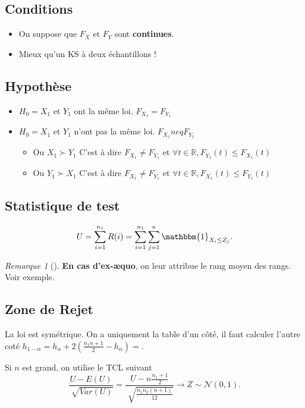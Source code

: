 \documentclass{article}
\theoremstyle{plain}%
\theoremstyle{definition}
\theoremstyle{remark}
\newtheorem*{rem}{Remarque}
\begin{document}
\subsection*{Conditions}
\begin{itemize}
    \item On suppose que $ F_X $ et $ F_Y $ sont \textbf{continues}.
    \item Mieux qu'un KS à deux échantillons !
\end{itemize}


\subsection*{Hypothèse}
\begin{itemize}
    \item $ H_0 = X_1 $ et $ Y_1 $ ont la même loi. $ F_{X_1} = F_{Y_1} $ 
    \item $ H_0 = X_1 $ et $ Y_1 $ n'ont pas la même loi. $ F_{X_1} neq F_{Y_1} $ \begin{itemize}
        \item Ou $ X_1 \succ Y_1 $ C'est à dire $ F_{X_1} \neq F_{Y_1} $ et $ \forall t \in \mathbb{R}, F_{Y_1}(t) \leq F_{X_1}(t) $ 
        \item Ou $ Y_1 \succ X_1 $ C'est à dire $ F_{X_1} \neq F_{Y_1} $ et $ \forall t \in \mathbb{R}, F_{X_1}(t) \leq F_{Y_1}(t) $ 
    \end{itemize}
\end{itemize}

\subsection*{Statistique de test}
\[
    U = \sum_{i=1}^{n_1}R(i) = \sum_{i=1}^{n_1} \sum_{j=1}^{n}\mathbbm{1}_{X_i \leq Z_j}
.\]
\begin{rem}[]
    \textbf{En cas d'ex-æquo}, on leur attribue le rang moyen des rangs. Voir exemple.
\end{rem}

\subsection*{Zone de Rejet}
La loi est symétrique. On a uniquement la table d'un côté, il faut calculer l'autre coté $ h_{1- \alpha} = h_\alpha + 2(\frac{n_1 n+1}{2} - h_\alpha )=  $.

Si $ n $ est grand, on utilise le TCL suivant 
\[
    \frac{U - E(U)}{\sqrt[]{Var(U)}} = \frac{U - n \frac{n_1 + 1}{2}}{\sqrt[]{\frac{n_1 n_2 (n+1)}{12}}} \to Z \sim \mathcal{N}(0,1)
.\]
\end{document}
